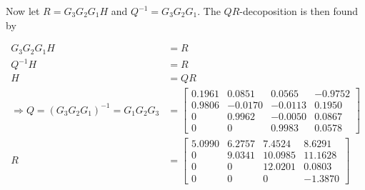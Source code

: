 Now let $R = G_3 G_2 G_1 H$ and $Q^{-1} = G_3 G_2 G_1$. The $QR$-decoposition is then found by

\begin{align}
G_3 G_2 G_1 H &= R \\
Q^{-1} H &= R \\
H &= QR \\
\Rightarrow
Q = (G_3 G_2 G_1)^{-1} = G_1 G_2 G_3 &= 
  \left[
 \begin{matrix}
    0.1961  &  0.0851 &  0.0565   & -0.9752 \\
    0.9806  & -0.0170 & -0.0113  &  0.1950 \\
    0       &  0.9962 & -0.0050  &  0.0867 \\
    0       &  0      &  0.9983  &  0.0578
 \end{matrix}
 \right] \\
R &= 
  \left[
 \begin{matrix}
    5.0990  &  6.2757 & 7.4524   &  8.6291 \\
    0       &  9.0341 & 10.0985  &  11.1628 \\
    0       &  0      & 12.0201  &   0.0803 \\
    0       &  0      & 0       &  -1.3870
 \end{matrix}
 \right] 
\end{align}


